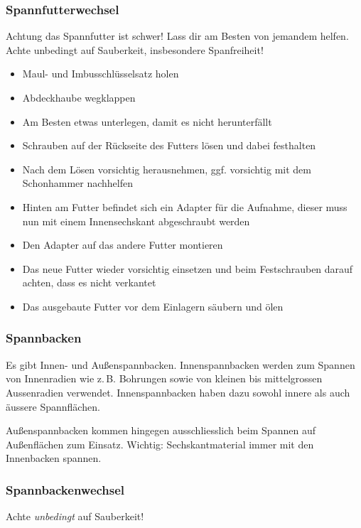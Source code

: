 \documentclass{\basedir/fablab-document}
\begin{document}
\subsubsection{Spannfutterwechsel}

Achtung das Spannfutter ist schwer! Lass dir am Besten von jemandem helfen. Achte unbedingt auf Sauberkeit, insbesondere Spanfreiheit!
\begin{itemize}
\item Maul- und Imbusschlüsselsatz holen
\item Abdeckhaube wegklappen
\item Am Besten etwas unterlegen, damit es nicht herunterfällt
\item Schrauben auf der Rückseite des Futters lösen und dabei festhalten 
\item Nach dem Lösen vorsichtig herausnehmen, ggf. vorsichtig mit dem Schonhammer nachhelfen
\item Hinten am Futter befindet sich ein Adapter für die Aufnahme, dieser muss nun mit einem Innensechskant abgeschraubt werden
\item Den Adapter auf das andere Futter montieren
\item Das neue Futter wieder vorsichtig einsetzen und beim Festschrauben darauf achten, dass es nicht verkantet
\item Das ausgebaute Futter vor dem Einlagern säubern und ölen
\end{itemize}

\subsubsection{Spannbacken}

Es gibt Innen- und Außenspannbacken.
Innenspannbacken werden zum Spannen von Innenradien wie z.\,B. Bohrungen sowie von kleinen bis mittelgrossen Aussenradien verwendet. Innenspannbacken haben dazu sowohl innere als auch äussere Spannflächen.

Außenspannbacken kommen hingegen ausschliesslich beim Spannen auf Außenflächen zum Einsatz.
Wichtig: Sechskantmaterial immer mit den Innenbacken spannen.


\subsubsection{Spannbackenwechsel}
\label{zerspanung:spannbackenwechsel}
Achte \emph{unbedingt} auf Sauberkeit!
 
\end{document}

